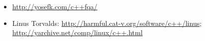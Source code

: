 \chapter{\CPP}







\section{}

\begin{itemize}

\item
\url{http://yosefk.com/c++fqa/}

\item
Linus Torvalds: \url{http://harmful.cat-v.org/software/c++/linus}; \url{http://yarchive.net/comp/linux/c++.html}

\end{itemize}

